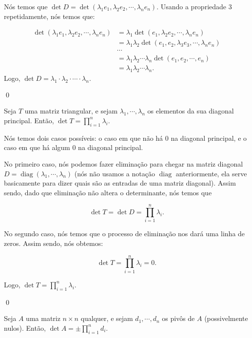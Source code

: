 \begin{Proof}
	Nós temos que $\det D = \det(\lambda_1e_1, \lambda_2e_2, \cdots, \lambda_ne_n)$. Usando a propriedade $3$ repetidamente, nós temos que:
	
	\begin{align*}
		\det(\lambda_1e_1, \lambda_2e_2, \cdots, \lambda_ne_n) &= \lambda_1\det(e_1, \lambda_2e_2, \cdots, \lambda_ne_n)\\ &= \lambda_1\lambda_2\det(e_1, e_2, \lambda_3e_3, \cdots, \lambda_ne_n) \\ &\cdots \\ &= \lambda_1\lambda_2\cdots\lambda_n\det(e_1, e_2, \cdots, e_n)\\ &= \lambda_1\lambda_2\cdots\lambda_n.
	\end{align*}
	Logo, $\det D = \lambda_1\cdot\lambda_2\cdot\cdots\cdot\lambda_n$.
	
	\qed
\end{Proof}

\begin{Proposition}
	Seja $T$ uma matriz triangular, e sejam $\lambda_1, \cdots, \lambda_n$ os elementos da sua diagonal principal. Então, $\det T = \prod\limits_{i = 1}^{n} \lambda_i$.
\end{Proposition}

\begin{Proof}
	Nós temos dois casos possíveis: o caso em que não há $0$ na diagonal principal, e o caso em que há algum $0$ na diagonal principal. 
	
	No primeiro caso, nós podemos fazer eliminação para chegar na matriz diagonal $D = \operatorname{diag}(\lambda_1, \cdots, \lambda_n)$ (nós não usamos a notação $\operatorname{diag}$ anteriormente, ela serve basicamente para dizer quais são as entradas de uma matriz diagonal). Assim sendo, dado que eliminação não altera o determinante, nós temos que
	
	$$
	\det T = \det D = \prod\limits_{i = 1}^{n}\lambda_i.
	$$
	
	No segundo caso, nós temos que o processo de eliminação nos dará uma linha de zeros. Assim sendo, nós obtemos:
	
	$$
	\det T = \prod\limits_{i = 1}^{n}\lambda_i = 0.
	$$
	
	Logo, $\det T = \prod\limits_{i = 1}^{n}\lambda_i$.
	
	\qed
\end{Proof}

\begin{Proposition}
	Seja $A$ uma matriz $n\times n$ qualquer, e sejam $d_1, \cdots, d_n$ os pivôs de $A$ (possivelmente nulos). Então, $\det A = \pm\prod\limits_{i = 1}^{n}d_i$.
\end{Proposition}

